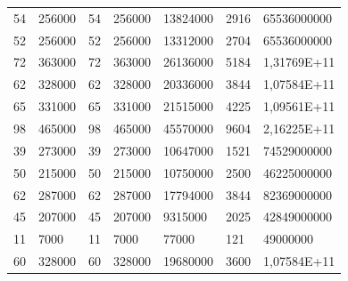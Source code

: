 \begin{enumerate}
\begin{table}
\begin{tabular}{lllllll}
54                    & 256000                 & 54                  & 256000              & 13824000                                    & 2916                    & 65536000000             \\
52                    & 256000                 & 52                  & 256000              & 13312000                                    & 2704                    & 65536000000             \\
72                    & 363000                 & 72                  & 363000              & 26136000                                    & 5184                    & 1,31769E+11             \\
62                    & 328000                 & 62                  & 328000              & 20336000                                    & 3844                    & 1,07584E+11             \\
65                    & 331000                 & 65                  & 331000              & 21515000                                    & 4225                    & 1,09561E+11             \\
98                    & 465000                 & 98                  & 465000              & 45570000                                    & 9604                    & 2,16225E+11             \\
39                    & 273000                 & 39                  & 273000              & 10647000                                    & 1521                    & 74529000000             \\
50                    & 215000                 & 50                  & 215000              & 10750000                                    & 2500                    & 46225000000             \\
62                    & 287000                 & 62                  & 287000              & 17794000                                    & 3844                    & 82369000000             \\
45                    & 207000                 & 45                  & 207000              & 9315000                                     & 2025                    & 42849000000             \\
11                    & 7000                   & 11                  & 7000                & 77000                                       & 121                     & 49000000                \\
60                    & 328000                 & 60                  & 328000              & 19680000                                    & 3600                    & 1,07584E+11             \\

\end{tabular}
\end{table}
\end{enumerate}
